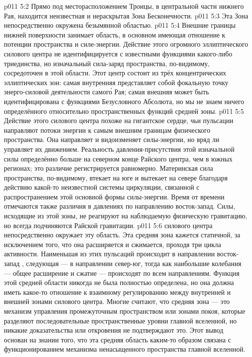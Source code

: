 \vs p011 5:2 Прямо под месторасположением Троицы, в центральной части нижнего Рая, находится неизвестная и нераскрытая Зона Бесконечности.
\vs p011 5:3 Эта Зона непосредственно окружена безымянной областью.
\vs p011 5:4 Внешние границы нижней поверхности занимает область, в основном имеющая отношение к потенции пространства и силе\hyp{}энергии. Действие этого огромного эллиптического силового центра не идентифицируется с известными функциями какого\hyp{}либо триединства, но изначальный сила\hyp{}заряд пространства, по\hyp{}видимому, сосредоточен в этой области. Этот центр состоит из трёх концентрических эллиптических зон: самая внутренняя представляет собой фокальную точку энерго\hyp{}силовой деятельности самог\'о Рая; самая внешняя может быть идентифицирована с функциями Безусловного Абсолюта, но мы не знаем ничего определённого относительно пространственных функций средней зоны.
\vs p011 5:5 \pc Действие  этого силового центра похоже на гигантское сердце, чьи пульсации направляют потоки энергии к самым внешним границам физического пространства. Она направляет и видоизменяет силы\hyp{}энергии, но вряд ли управляет их движением. Реальность давления\hyp{}присутствия этой изначальной силы определённо больше на северном конце Райского центра, чем в южных регионах; это различие регистрируется равномерно. Материнская сила пространства, по\hyp{}видимому, втекает на юге и вытекает на севере благодаря действию какой\hyp{}то неизвестной системы циркуляции, связанной с распространением этой основной формы силы\hyp{}энергии. Время от времени отмечаются также различия в давлениях по направлению восток\hyp{}запад. Силы, исходящие из этой зоны, не реагируют на наблюдаемую физическую гравитацию, но всегда подчиняются Райской гравитации.
\vs p011 5:6 \pc {} силового центра непосредственно окружает эту область. Эта средняя зона кажется статичной, за исключением того, что она расширяется и сжимается, проходя три цикла активности. Наименьшая из этих пульсаций происходит в направлении восток\hyp{}запад , следующая --- в направлении север\hyp{}юг, тогда как наибольшие колебания --- общее расширение и сжатие --- происходят по всем направлениям. Функция этой средней области никогда не была полностью определена, но она должна иметь какое\hyp{}то отношение к взаимному регулированию между внутренней и внешней зонами силового центра. Многие считают, что средняя зона --- это механизм управления промежуточным пространством или зонами покоя, которые разделяют последовательные пространственные уровни главной вселенной, но никакие доказательства или откровения не подтверждают это. Этот вывод основан на знании того, что эта средняя область каким\hyp{}то образом связана с функционированием механизма ненасыщенного пространства главной вселенной.
